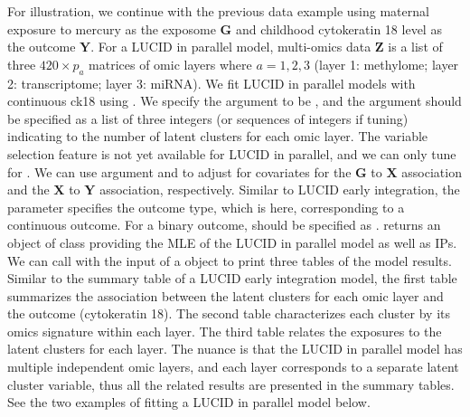 For illustration, we continue with the previous data example using maternal exposure to mercury as the exposome $\bm G$ and childhood cytokeratin 18 level as the outcome $\bm Y$. For a LUCID in parallel model, multi-omics data $\bm Z$ is a list of three $420 \times p_a$ matrices of omic layers where $a = 1, 2, 3$ (layer 1: methylome; layer 2: transcriptome; layer 3: miRNA). We fit LUCID in parallel models with continuous ck18 using . We specify the argument  to be , and the argument  should be specified as a list of three integers (or sequences of integers if tuning) indicating to the number of latent clusters for each omic layer. The variable selection feature is not yet available for LUCID in parallel, and we can only tune for . We can use argument  and  to adjust for covariates for the $\bm G$ to $\bm X$ association and the $\bm X$ to $\bm Y$ association, respectively. Similar to LUCID early integration, the parameter  specifies the outcome type, which is  here, corresponding to a continuous outcome. For a binary outcome,  should be specified as .  returns an object of class  providing the MLE of the LUCID in parallel model as well as IPs. We can call  with the input of a  object to print three tables of the model results. Similar to the summary table of a LUCID early integration model, the first table summarizes the association between the latent clusters for each omic layer and the outcome (cytokeratin 18). The second table characterizes each cluster by its omics signature within each layer. The third table relates the exposures to the latent clusters for each layer. The nuance is that the LUCID in parallel model has multiple independent omic layers, and each layer corresponds to a separate latent cluster variable, thus all the related results are presented in the summary tables. See the two examples of fitting a LUCID in parallel model below.

